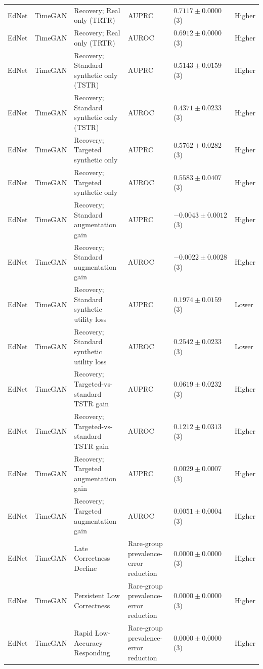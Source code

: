 \begin{longtable}{@{}p{2.25cm}p{2.05cm}p{4.7cm}p{5.0cm}p{2.6cm}p{1.25cm}@{}}
EdNet & TimeGAN & Recovery; Real only (TRTR) & AUPRC & $0.7117 \mathbin{\pm} 0.0000$ (3) & Higher \\
EdNet & TimeGAN & Recovery; Real only (TRTR) & AUROC & $0.6912 \mathbin{\pm} 0.0000$ (3) & Higher \\
EdNet & TimeGAN & Recovery; Standard synthetic only (TSTR) & AUPRC & $0.5143 \mathbin{\pm} 0.0159$ (3) & Higher \\
EdNet & TimeGAN & Recovery; Standard synthetic only (TSTR) & AUROC & $0.4371 \mathbin{\pm} 0.0233$ (3) & Higher \\
EdNet & TimeGAN & Recovery; Targeted synthetic only & AUPRC & $0.5762 \mathbin{\pm} 0.0282$ (3) & Higher \\
EdNet & TimeGAN & Recovery; Targeted synthetic only & AUROC & $0.5583 \mathbin{\pm} 0.0407$ (3) & Higher \\
EdNet & TimeGAN & Recovery; Standard augmentation gain & AUPRC & $-0.0043 \mathbin{\pm} 0.0012$ (3) & Higher \\
EdNet & TimeGAN & Recovery; Standard augmentation gain & AUROC & $-0.0022 \mathbin{\pm} 0.0028$ (3) & Higher \\
EdNet & TimeGAN & Recovery; Standard synthetic utility loss & AUPRC & $0.1974 \mathbin{\pm} 0.0159$ (3) & Lower \\
EdNet & TimeGAN & Recovery; Standard synthetic utility loss & AUROC & $0.2542 \mathbin{\pm} 0.0233$ (3) & Lower \\
EdNet & TimeGAN & Recovery; Targeted-vs-standard TSTR gain & AUPRC & $0.0619 \mathbin{\pm} 0.0232$ (3) & Higher \\
EdNet & TimeGAN & Recovery; Targeted-vs-standard TSTR gain & AUROC & $0.1212 \mathbin{\pm} 0.0313$ (3) & Higher \\
EdNet & TimeGAN & Recovery; Targeted augmentation gain & AUPRC & $0.0029 \mathbin{\pm} 0.0007$ (3) & Higher \\
EdNet & TimeGAN & Recovery; Targeted augmentation gain & AUROC & $0.0051 \mathbin{\pm} 0.0004$ (3) & Higher \\
EdNet & TimeGAN & Late Correctness Decline & Rare-group prevalence-error reduction & $0.0000 \mathbin{\pm} 0.0000$ (3) & Higher \\
EdNet & TimeGAN & Persistent Low Correctness & Rare-group prevalence-error reduction & $0.0000 \mathbin{\pm} 0.0000$ (3) & Higher \\
EdNet & TimeGAN & Rapid Low-Accuracy Responding & Rare-group prevalence-error reduction & $0.0000 \mathbin{\pm} 0.0000$ (3) & Higher \\

\end{longtable}
